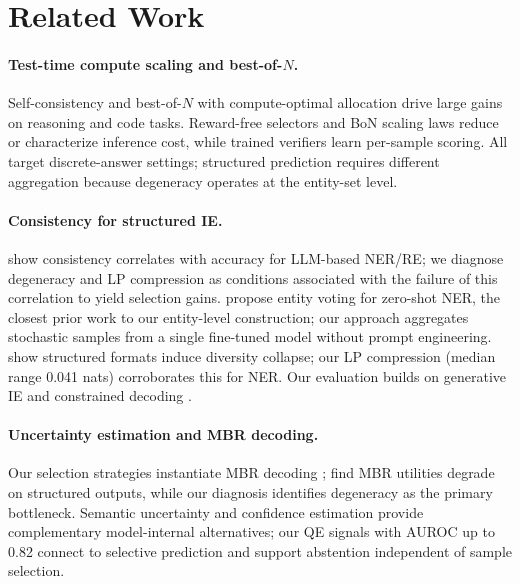 \section{Related Work}\label{sec:related}

\paragraph{Test-time compute scaling and best-of-$N$.}
Self-consistency \cite{wang2023selfconsistency} and best-of-$N$ with compute-optimal allocation \cite{snell2025scaling, brown2024monkeys} drive large gains on reasoning and code tasks.
Reward-free selectors \cite{taubenfeld2025cisc, kang2025selfcertainty} and BoN scaling laws \cite{gao2023scaling} reduce or characterize inference cost, while trained verifiers \cite{cobbe2021verifiers, lightman2024verify} learn per-sample scoring.
All target discrete-answer settings; structured prediction requires different aggregation because degeneracy operates at the entity-set level.

\paragraph{Consistency for structured IE.}
\citet{yao2026consistency} show consistency correlates with accuracy for LLM-based NER/RE; we diagnose degeneracy and LP compression as conditions associated with the failure of this correlation to yield selection gains.
\citet{xie2023zeroshot} propose entity voting for zero-shot NER, the closest prior work to our entity-level construction; our approach aggregates stochastic samples from a single fine-tuned model without prompt engineering.
\citet{yun2025price} show structured formats induce diversity collapse; our LP compression (median range 0.041 nats) corroborates this for NER.
Our evaluation builds on generative IE \cite{zhou2024uniner, sainz2024gollie} and constrained decoding \cite{willard2023guided, dong2024xgrammar}.

\paragraph{Uncertainty estimation and MBR decoding.}
Our selection strategies instantiate MBR decoding \cite{eikema2022sampling}; \citet{eikema2025structured} find MBR utilities degrade on structured outputs, while our diagnosis identifies degeneracy as the primary bottleneck.
Semantic uncertainty \cite{kuhn2023semantic} and confidence estimation \cite{geng2024confidence, xia2025survey} provide complementary model-internal alternatives; our QE signals with AUROC up to 0.82 connect to selective prediction \cite{geifman2017selective} and support abstention independent of sample selection.
